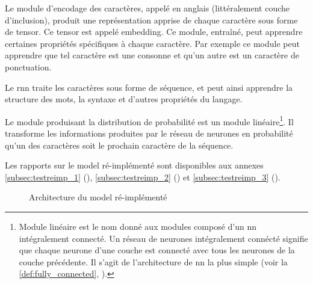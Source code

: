 Le module d'encodage des caractères, appelé  en anglais (littéralement \og couche d'inclusion\fg{}), produit une représentation apprise de chaque caractère sous forme de \gls{tensor}. Ce \gls{tensor} est appelé \gls{embedding}. Ce module, entraîné, peut apprendre certaines propriétés spécifiques à chaque caractère. Par exemple ce module peut apprendre que tel caractère est une consonne et qu'un autre est un caractère de ponctuation. \label{def:embedding}

Le \gls{rnn} traite les caractères sous forme de séquence, et peut ainsi apprendre la structure des mots, la syntaxe et d'autres propriétés du langage.

Le module produisant la distribution de probabilité est un module linéaire\footnote{\og Module linéaire \fg{} est le nom donné aux modules composé d'un \gls{nn} intégralement connecté. Un réseau de neurones intégralement connécté signifie que chaque neurone d'une couche est connecté avec tous les neurones de la couche précédente. Il s'agit de l'architecture de \gls{nn} la plus simple (voir la \autoref{def:fully_connected}, ).\label{def:fully_connected_2}\label{def:lin_module_2}}.
Il transforme les informations produites par le réseau de neurones en probabilité qu'un des caractères soit le prochain caractère de la séquence.

Les rapports sur le \gls{model} ré-implémenté sont disponibles aux annexes \ref{subsec:testreimp_1} (), \ref{subsec:testreimp_2} () et \ref{subsec:testreimp_3} (). 

\begin{figure}[h]
	\centering
	\scalebox{1}{}
	\caption[Architecture du  ré-implémenté]{Architecture du \gls{model} ré-implémenté}
	\label{fig:reimplement}
\end{figure}
%
